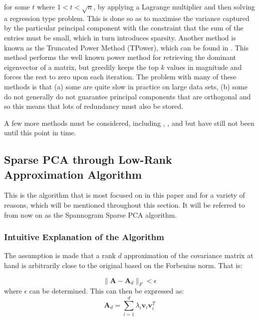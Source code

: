 \documentclass[11pt,a4paper]{article}
\begin{document}
for some $t$ where $1<t<\sqrt{n}$, by applying a Lagrange multiplier and then solving a regression type problem. This is done so as to maximise the variance captured by the particular principal component with the constraint that the sum of the entries must be small, which in turn introduces sparsity. Another method is known as the Truncated Power Method (TPower), which can be found in \cite{truncpower}. This method performs the well known power method for retrieving the dominant eigenvector of a matrix, but greedily keeps the top $k$ values in magnitude and forces the rest to zero upon each iteration. The problem with many of these methods is that (a) some are quite slow in practice on large data sets, (b) some do not generally do not guarantee principal components that are orthogonal and so this means that lots of redundancy must also be stored. 

A few more methods must be considered, including \cite{shen}, \cite{zou}, \cite{daspremont} and \cite{asteris} but have still not been until this point in time. 

\subsection{Sparse PCA through Low-Rank Approximation Algorithm\cite{dimakis}}
This is the algorithm that is most focused on in this paper and for a variety of reasons, which will be mentioned throughout this section. It will be referred to from now on as the Spannogram Sparse PCA algorithm.

\subsubsection{Intuitive Explanation of the Algorithm}
The assumption is made that a rank $d$ approximation of the covariance matrix at hand is arbitrarily close to the original based on the Forbenius norm. That is:

\begin{equation*}
\|\mathbf{A} - \mathbf{A}_d\|_F < \epsilon
\end{equation*}
where $\epsilon$ can be determined. This can then be expressed as:
\begin{equation*}
\mathbf{A}_d = \sum_{i=1}^d \lambda_i \mathbf{v}_i \mathbf{v}_i^T
\end{equation*}
\end{document}
